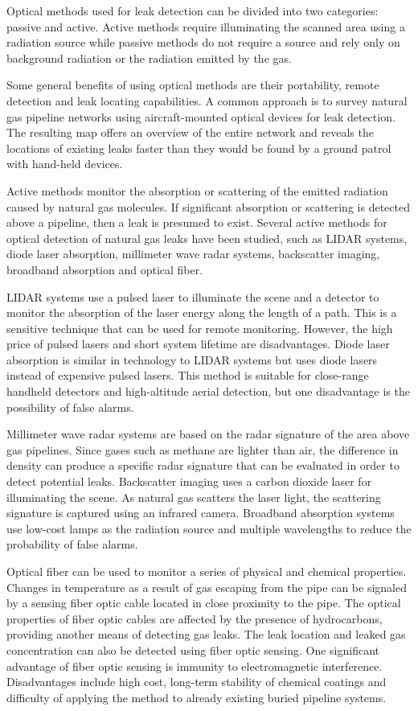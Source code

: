 Optical methods used for leak detection can be divided into two categories: passive and active. Active methods require illuminating the scanned area using a radiation source while passive methods do not require a source and rely only on background radiation or the radiation emitted by the gas.

Some general benefits of using optical methods are their portability, remote detection and leak locating capabilities. A common approach is to survey natural gas pipeline networks using aircraft-mounted optical devices for leak detection. The resulting map offers an overview of the entire network and reveals the locations of existing leaks faster than they would be found by a ground patrol with hand-held devices.

Active methods monitor the absorption or scattering of the emitted radiation caused by natural gas molecules. If significant absorption or scattering is detected above a pipeline, then a leak is presumed to exist. Several active methods for optical detection of natural gas leaks have been studied, such as LIDAR systems, diode laser absorption, millimeter wave radar systems, backscatter imaging, broadband absorption and optical fiber.

LIDAR systems use a pulsed laser to illuminate the scene and a detector to monitor the absorption of the laser energy along the length of a path. This is a sensitive technique that can be used for remote monitoring. However, the high price of pulsed lasers and short system lifetime are disadvantages. Diode laser absorption is similar in technology to LIDAR systems but uses diode lasers instead of expensive pulsed lasers. This method is suitable for close-range handheld detectors and high-altitude aerial detection, but one disadvantage is the possibility of false alarms.

Millimeter wave radar systems are based on the radar signature of the area above gas pipelines. Since gases such as methane are lighter than air, the difference in density can produce a specific radar signature that can be evaluated in order to detect potential leaks. Backscatter imaging uses a carbon dioxide laser for illuminating the scene. As natural gas scatters the laser light, the scattering signature is captured using an infrared camera. Broadband absorption systems use low-cost lamps as the radiation source and multiple wavelengths to reduce the probability of false alarms.

Optical fiber can be used to monitor a series of physical and chemical properties. Changes in temperature as a result of gas escaping from the pipe can be signaled by a sensing fiber optic cable located in close proximity to the pipe. The optical properties of fiber optic cables are affected by the presence of hydrocarbons, providing another means of detecting gas leaks. The leak location and leaked gas concentration can also be detected using fiber optic sensing. One significant advantage of fiber optic sensing is immunity to electromagnetic interference. Disadvantages include high cost, long-term stability of chemical coatings and difficulty of applying the method to already existing buried pipeline systems.

